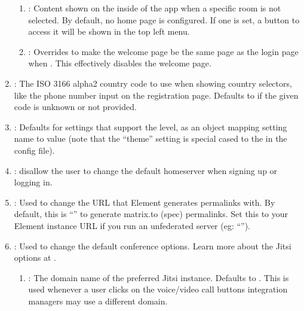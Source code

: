 \documentclass[letterpaper,10pt,openany,oneside,english]{sphinxmanual}
\begin{document}
\begin{enumerate}
\begin{enumerate}
\item {} 
\sphinxAtStartPar
{}: Content shown on the inside of the app when a specific room is
not selected. By default, no home page is configured. If one is set, a
button to access it will be shown in the top left menu.

\item {} 
\sphinxAtStartPar
{}: Overrides  to make the welcome page be the
same page as the login page when . This effectively disables the
welcome page.

\end{enumerate}

\item {} 
\sphinxAtStartPar
{}: The ISO 3166 alpha2 country code to use when showing
country selectors, like the phone number input on the registration page.
Defaults to  if the given code is unknown or not provided.

\item {} 
\sphinxAtStartPar
{}:  Defaults for settings that support the  level,
as an object mapping setting name to value (note that the “theme” setting
is special cased to the  in the config file).

\item {} 
\sphinxAtStartPar
{}: disallow the user to change the
default homeserver when signing up or logging in.

\item {} 
\sphinxAtStartPar
{}: Used to change the URL that Element generates permalinks with.
By default, this is “” to generate matrix.to (spec) permalinks.
Set this to your Element instance URL if you run an unfederated server (eg:
“”).

\item {} 
\sphinxAtStartPar
{}: Used to change the default conference options. Learn more about the
Jitsi options at .
\begin{enumerate}
%
\item {} 
\sphinxAtStartPar
{}: The domain name of the preferred Jitsi instance. Defaults
to . This is used whenever a user clicks on the voice/video
call buttons \sphinxhyphen{} integration managers may use a different domain.


\end{enumerate}
\end{enumerate}
\end{document}
